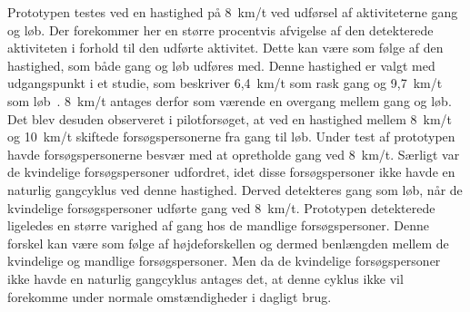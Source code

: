 Prototypen testes ved en hastighed på 8~km/t ved udførsel af aktiviteterne gang og løb. Der forekommer her en større procentvis afvigelse af den detekterede aktiviteten i forhold til den udførte aktivitet. Dette kan være som følge af den hastighed, som både gang og løb udføres med. Denne hastighed er valgt med udgangspunkt i et studie, som beskriver 6,4~km/t som rask gang og 9,7~km/t som løb~\citep{Miles2007}. 8~km/t antages derfor som værende en overgang mellem gang og løb. Det blev desuden observeret i pilotforsøget, at ved en hastighed mellem 8~km/t og 10~km/t skiftede forsøgspersonerne fra gang til løb. Under test af prototypen havde forsøgspersonerne besvær med at opretholde gang ved 8~km/t. Særligt var de kvindelige forsøgspersoner udfordret, idet disse forsøgspersoner ikke havde en naturlig gangcyklus ved denne hastighed. Derved detekteres gang som løb, når de kvindelige forsøgspersoner udførte gang ved 8~km/t. Prototypen detekterede ligeledes en større varighed af gang hos de mandlige forsøgspersoner. Denne forskel kan være som følge af højdeforskellen og dermed benlængden mellem de kvindelige og mandlige forsøgspersoner. Men da de kvindelige forsøgspersoner ikke havde en naturlig gangcyklus antages det, at denne cyklus ikke vil forekomme under normale omstændigheder i dagligt brug.